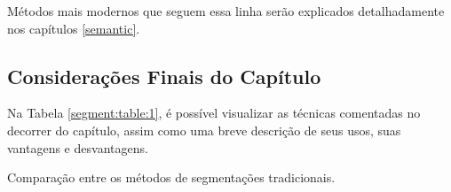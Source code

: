 Métodos mais modernos que seguem essa linha serão explicados detalhadamente nos capítulos \ref{semantic}.


\subsection{Considerações Finais do Capítulo}
\label{segment:conclusion}

Na Tabela \ref{segment:table:1}, é possível visualizar as técnicas comentadas no decorrer do capítulo, assim como uma breve descrição de seus usos, suas vantagens e desvantagens.

\begin{table}[H]
\centering
\caption{Comparação entre os métodos de segmentações tradicionais.}
\label{segment:table:1}
\resizebox{\textwidth}{!}{%

}
\end{table}
